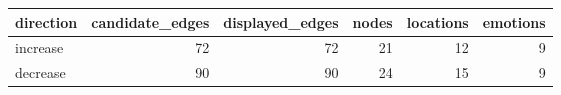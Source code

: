 \begin{tabular}{lrrrrr}
\toprule
direction & candidate\_edges & displayed\_edges & nodes & locations & emotions \\
\midrule
increase & 72 & 72 & 21 & 12 & 9 \\
decrease & 90 & 90 & 24 & 15 & 9 \\
\bottomrule
\end{tabular}
